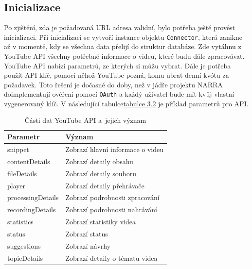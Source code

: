 \subsection{Inicializace}
\par Po zjištění, zda je požadovaná URL adresa validní, bylo potřeba ještě provést inicializaci. Při inicializaci se vytvoří instance objektu \texttt{Connector}, která zanikne až v momentě, kdy se všechna data přelijí do struktur databáze. Zde vytáhnu z YouTube API všechny potřebné informace o videu, které budu dále zpracovávat. YouTube API nabízí parametrů, ze kterých si můžu vybrat. Dále je potřeba použít API klíč\cite{apistart}, pomocí něhož YouTube pozná, komu ubrat denní kvótu za požadavek. Toto řešení je dočasné do doby, než v jádře projektu NARRA doimplementují ověření pomocí \texttt{OAuth} a každý uživatel bude mít kvůj vlastní vygenerovaný klíč. V následující tabulce\hyperlink{apiparams}{tabulce 3.2} je příklad parametrů pro API.

\begin{table}[h!]
\hypertarget{apiparams}{}
\centering
\begin{tabular}{| l | l |}
\hline
\textbf{Parametr} & \textbf{Význam} \\
\hline
snippet & Zobrazí hlavní informace o videu \\
\hline
contentDetails & Zobrazí detaily obsahu \\
\hline
fileDetails & Zobrazí detaily souboru \\
\hline
player & Zobrazí detaily přehrávače \\
\hline
processingDetails & Zobrazí podrobnosti zpracování \\
\hline
recordingDetails & Zobrazí podrobnosti nahrávání \\
\hline
statistics & Zobrazí statistiky videa \\
\hline
status & Zobrazí status \\
\hline
suggestions & Zobrazí návrhy \\
\hline
topicDetails & Zobrazí detaily o tématu videa \\
\hline
\end{tabular}
\caption[Části dat YouTube API a~jejich význam]{Části dat YouTube API a~jejich význam}
\end{table}


